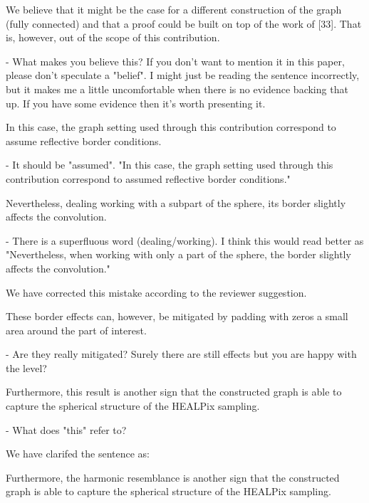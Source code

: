 \documentclass[12pt,a4paper]{article}
\newcommand{\todo}[1]{{\color[rgb]{.6,.1,.6}{TODO: #1}}}
\newcommand{\1}{\b{1}}              %
\newcommand{\0}{\b{0}}              %
\begin{document}
\begin{mdframed}[style=comment]
We believe that it might be the case for a different construction of the graph (fully connected) and that a proof could be built on top of the work of [33]. That is, however, out of the scope of this contribution.

- What makes you believe this? If you don't want to mention it in this paper, please don't speculate a "belief". I might just be reading the sentence incorrectly, but it makes me a little uncomfortable when there is no evidence backing that up. If you have some evidence then it's worth presenting it.
\end{mdframed}
\todo{Assign: @nati, @michael}


\begin{mdframed}[style=comment]
In this case, the graph setting used through this contribution correspond to assume reflective border conditions.

- It should be "assumed". "In this case, the graph setting used through this contribution correspond to assumed reflective border conditions."
\end{mdframed}
\todo{@assign: Tomek}

\begin{mdframed}[style=comment]
Nevertheless, dealing working with a subpart of the sphere, its border slightly affects the convolution.

- There is a superfluous word (dealing/working). I think this would read better as "Nevertheless, when working with only a part of the sphere, the border slightly affects the convolution."
\end{mdframed}
We have corrected this mistake according to the reviewer suggestion.

\begin{mdframed}[style=comment]
These border effects can, however, be mitigated by padding with zeros a small area around the part of interest.

- Are they really mitigated? Surely there are still effects but you are happy with the level?
\end{mdframed}
\todo{Assign: @nati, @michael}


\begin{mdframed}[style=comment]
Furthermore, this result is another sign that the constructed graph is able to capture the spherical structure of the HEALPix sampling.

- What does "this" refer to?
\end{mdframed}
We have clarifed the sentence as:
\begin{mdframed}[style=manuscript]
Furthermore, the harmonic resemblance is another sign that the constructed graph is able to capture the spherical
structure of the HEALPix sampling.
\end{mdframed}
\end{document}

